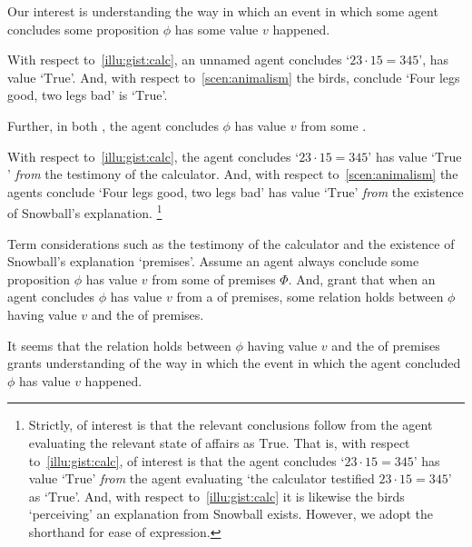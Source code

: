 \begin{note}
  Our interest is understanding the way in which an event in which some agent \vAgent{} concludes some proposition \(\phi\) has some value \(v\) happened.

  With respect to~\autoref{illu:gist:calc}, an unnamed agent concludes `\(23 \cdot 15 = 345\)', has value `\(\text{True}\)'.
  And, with respect to~\autoref{scen:animalism} the birds, conclude `Four legs good, two legs bad' is `\(\text{True}\)'.

  Further, in both , the agent concludes \(\phi\) has value \(v\) from some \poP{}.

  With respect to~\autoref{illu:gist:calc}, the agent concludes `\(23 \cdot 15 = 345\)' has value `\(\text{True}\)' \emph{from} the testimony of the calculator.
  And, with respect to~\autoref{scen:animalism} the agents conclude `Four legs good, two legs bad' has value `\(\text{True}\)' \emph{from} the existence of Snowball's explanation.%
  \footnote{
    Strictly, of interest is that the relevant conclusions follow from the agent evaluating the relevant state of affairs as \(\text{True}\).
    That is, with respect to~\autoref{illu:gist:calc}, of interest is that the agent concludes `\(23 \cdot 15 = 345\)' has value `\(\text{True}\)' \emph{from} the agent evaluating `the calculator testified \(23 \cdot 15 = 345\)' as `\(\text{True}\)'.
    And, with respect to~\autoref{illu:gist:calc} it is likewise the birds `perceiving' an explanation from Snowball exists.
    However, we adopt the shorthand for ease of expression.
  }

  Term considerations such as the testimony of the calculator and the existence of Snowball's explanation `premises'.
  Assume an agent always conclude some proposition \(\phi\) has value \(v\) from some \poP{} of premises \(\Phi\).
  And, grant that when an agent concludes \(\phi\) has value \(v\) from a \poP{} of premises, some relation holds between \(\phi\) having value \(v\) and the \poP{} of premises.

  It seems that the relation holds between \(\phi\) having value \(v\) and the \poP{} of premises grants understanding of the way in which the event in which the agent concluded \(\phi\) has value \(v\) happened.
\end{note}

